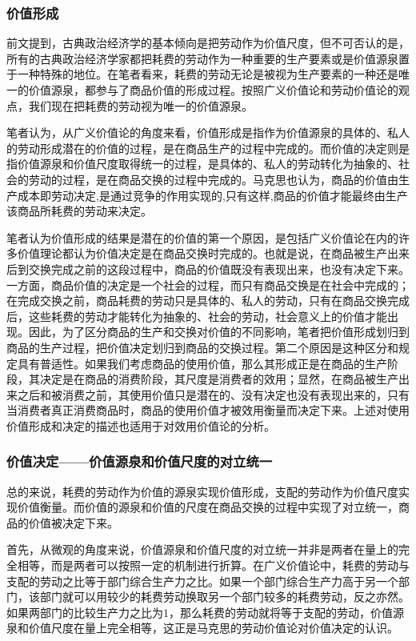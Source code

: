 \subsubsection{价值形成}

前文提到，古典政治经济学的基本倾向是把劳动作为价值尺度，但不可否认的是，所有的古典政治经济学家都把耗费的劳动作为一种重要的生产要素或是价值源泉置于一种特殊的地位。在笔者看来，耗费的劳动无论是被视为生产要素的一种还是唯一的价值源泉，都参与了商品价值的形成过程。按照广义价值论和劳动价值论的观点，我们现在把耗费的劳动视为唯一的价值源泉。

笔者认为，从广义价值论的角度来看，价值形成是指作为价值源泉的具体的、私人的劳动形成潜在的价值的过程，是在商品生产的过程中完成的。而价值的决定则是指价值源泉和价值尺度取得统一的过程，是具体的、私人的劳动转化为抽象的、社会的劳动的过程，是在商品交换的过程中完成的。马克思也认为，商品的价值由生产成本即劳动决定,是通过竞争的作用实现的,只有这样,商品的价值才能最终由生产该商品所耗费的劳动来决定\cite[3]{ZhangLeiShengMaKeSiLaoDongJieZhiLunYanJiuDeLiShiZhengTiXing2015}。 

笔者认为价值形成的结果是潜在的价值的第一个原因，是包括广义价值论在内的许多价值理论都认为价值决定是在商品交换时完成的。也就是说，在商品被生产出来后到交换完成之前的这段过程中，商品的价值既没有表现出来，也没有决定下来。一方面，商品价值的决定是一个社会的过程，而只有商品交换是在社会中完成的；在完成交换之前，商品耗费的劳动只是具体的、私人的劳动，只有在商品交换完成后，这些耗费的劳动才能转化为抽象的、社会的劳动，社会意义上的价值才能出现。因此，为了区分商品的生产和交换对价值的不同影响，笔者把价值形成划归到商品的生产过程，把价值决定划归到商品的交换过程。第二个原因是这种区分和规定具有普适性。如果我们考虑商品的使用价值，那么其形成正是在商品的生产阶段，其决定是在商品的消费阶段，其尺度是消费者的效用；显然，在商品被生产出来之后和被消费之前，其使用价值只是潜在的、没有决定也没有表现出来的，只有当消费者真正消费商品时，商品的使用价值才被效用衡量而决定下来。上述对使用价值形成和决定的描述也适用于对效用价值论的分析。

\subsubsection{价值决定——价值源泉和价值尺度的对立统一}

总的来说，耗费的劳动作为价值的源泉实现价值形成，支配的劳动作为价值尺度实现价值衡量。而价值的源泉和价值的尺度在商品交换的过程中实现了对立统一，商品的价值被决定下来。

首先，从微观的角度来说，价值源泉和价值尺度的对立统一并非是两者在量上的完全相等，而是两者可以按照一定的机制进行折算。在广义价值论中，耗费的劳动与支配的劳动之比等于部门综合生产力之比。如果一个部门综合生产力高于另一个部门，该部门就可以用较少的耗费劳动换取另一个部门较多的耗费劳动，反之亦然。如果两部门的比较生产力之比为$1$，那么耗费的劳动就将等于支配的劳动，价值源泉和价值尺度在量上完全相等，这正是马克思的劳动价值论对价值决定的认识。

